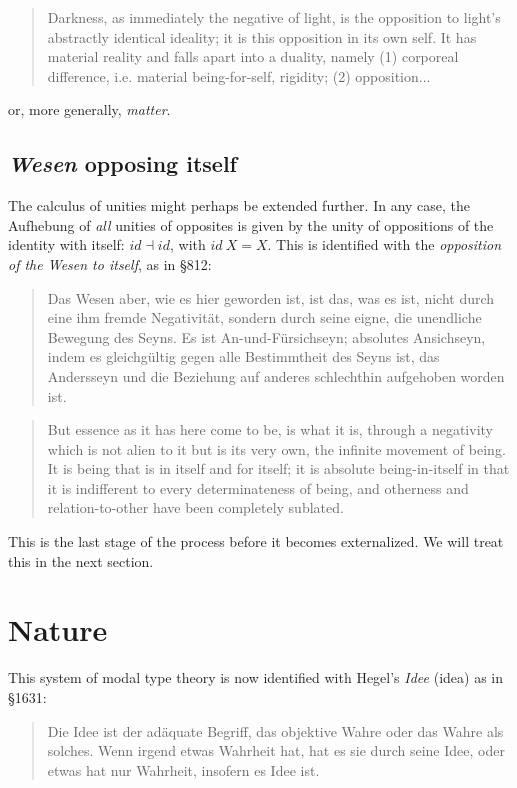 \documentclass{article}
\begin{document}
\begin{quote}
    Darkness, as immediately the negative of light, is the opposition to light’s abstractly identical ideality; it is this opposition in its own self. It has material reality and falls apart into a duality, namely (1) corporeal difference, i.e. material being-for-self, rigidity; (2) opposition...
\end{quote}

or, more generally, \emph{matter}.


\subsection{\emph{Wesen} opposing itself}\label{Wesen}
The calculus of unities might perhaps be extended further. In any case, the Aufhebung of \emph{all} unities of opposites is given by the unity of oppositions of the identity with itself: $id\dashv id$, with $id\ X=X$. This is identified with the \emph{opposition of the \emph{Wesen} to itself}, as in §812:

\begin{quote}
    Das Wesen aber, wie es hier geworden ist, ist das, was es ist, nicht durch eine ihm fremde Negativität, sondern durch seine eigne, die unendliche Bewegung des Seyns. Es ist An-und-Fürsichseyn; absolutes Ansichseyn, indem es gleichgültig gegen alle Bestimmtheit des Seyns ist, das Andersseyn und die Beziehung auf anderes schlechthin aufgehoben worden ist.
\end{quote}

\begin{quote}
    But essence as it has here come to be, is what it is, through a negativity which is not alien to it but is its very own, the infinite movement of being. It is being that is in itself and for itself; it is absolute being-in-itself in that it is indifferent to every determinateness of being, and otherness and relation-to-other have been completely sublated.
\end{quote}

This is the last stage of the process before it becomes externalized. We will treat this in the next section.


\section{Nature}
This system of modal type theory is now identified with Hegel's \emph{Idee} (idea) as in §1631:

\begin{quote}
    Die Idee ist der adäquate Begriff, das objektive Wahre oder das Wahre als solches. Wenn irgend etwas Wahrheit hat, hat es sie durch seine Idee, oder etwas hat nur Wahrheit, insofern es Idee ist.
\end{quote}
\end{document}
